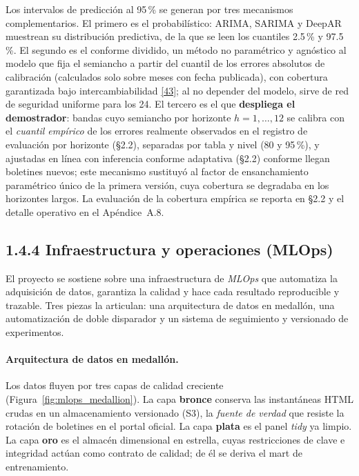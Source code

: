 \documentclass[12pt,letterpaper]{report}
\newcommand{\cita}[1]{\hyperref[bib:#1]{[#1]}}
\begin{document}
Los intervalos de predicción al 95\,\% se generan por tres mecanismos
complementarios. El primero es el probabilístico: ARIMA, SARIMA y DeepAR muestrean
su distribución predictiva, de la que se leen los cuantiles 2.5\,\% y 97.5\,\%. El segundo
es el conforme dividido, un método no paramétrico y agnóstico al modelo que fija el
semiancho a partir del cuantil de los errores absolutos de calibración (calculados solo
sobre meses con fecha publicada), con cobertura garantizada bajo intercambiabilidad
\cita{43}; al no depender del modelo, sirve de red de seguridad uniforme para los 24. El
tercero es el que \textbf{despliega el demostrador}: bandas cuyo semiancho por horizonte
$h=1,\dots,12$ se calibra con el \textit{cuantil empírico} de los errores realmente
observados en el registro de evaluación por horizonte (§2.2), separadas por tabla y
nivel (80 y 95\,\%), y ajustadas en línea con inferencia conforme adaptativa (§2.2)
conforme llegan boletines nuevos; este mecanismo sustituyó al factor de ensanchamiento
paramétrico único de la primera versión, cuya cobertura se degradaba en los horizontes
largos. La evaluación de la cobertura empírica se reporta en §2.2 y el detalle operativo en
el Apéndice~A.8.

\subsection{1.4.4 Infraestructura y operaciones (MLOps)}

El proyecto se sostiene sobre una infraestructura de \textit{MLOps} que automatiza la
adquisición de datos, garantiza la calidad y hace cada resultado reproducible y trazable. Tres
piezas la articulan: una arquitectura de datos en medallón, una automatización de doble
disparador y un sistema de seguimiento y versionado de experimentos.

\paragraph{Arquitectura de datos en medallón.} Los datos fluyen por tres capas de calidad
creciente (Figura~\ref{fig:mlops_medallion}). La capa \textbf{bronce} conserva las instantáneas
HTML crudas en un almacenamiento versionado (S3), la \textit{fuente de verdad} que resiste la
rotación de boletines en el portal oficial. La capa \textbf{plata} es el panel \textit{tidy} ya
limpio. La capa \textbf{oro} es el almacén dimensional en estrella, cuyas restricciones de clave
e integridad actúan como contrato de calidad; de él se deriva el mart de entrenamiento.
\end{document}
